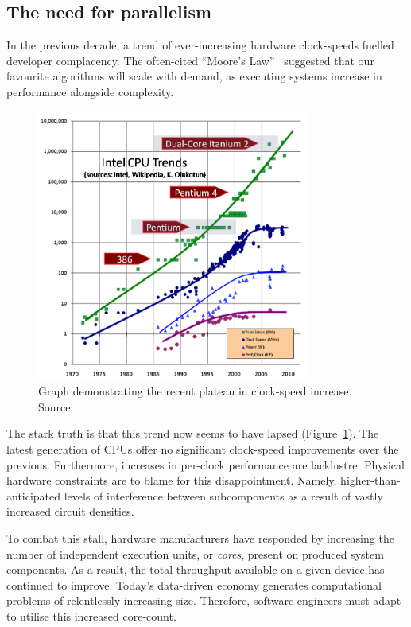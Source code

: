 \subsection{The need for parallelism}

In the previous decade, a trend of ever-increasing hardware clock-speeds fuelled developer complacency.
The often-cited ``Moore's Law''~\cite{moores_law} suggested that our favourite algorithms will scale with demand, as executing systems increase in performance alongside complexity.

\begin{figure}[h]
  \includegraphics[width=0.8\textwidth]{./figures/free_lunch_over.png}
  \caption{Graph demonstrating the recent plateau in clock-speed increase. Source:~\cite{free_lunch_over}}
  \label{fig:free_lunch_over}
\end{figure}

The stark truth is that this trend now seems to have lapsed (Figure~\ref{fig:free_lunch_over}).
The latest generation of \acp{CPU} offer no significant clock-speed improvements over the previous. Furthermore, increases in per-clock performance are lacklustre.
Physical hardware constraints are to blame for this disappointment. Namely, higher-than-anticipated levels of interference between subcomponents as a result of vastly increased circuit densities.

To combat this stall, hardware manufacturers have responded by increasing the number of independent execution units, or \emph{cores}, present on produced system components. As a result, the total throughput available on a given device has continued to improve.
Today's data-driven economy generates computational problems of relentlessly increasing size. Therefore, software engineers must adapt to utilise this increased core-count.

